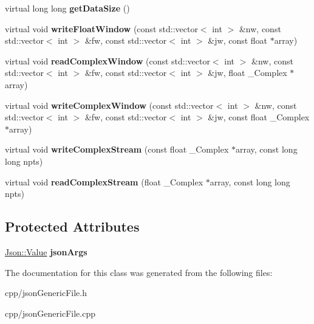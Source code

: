 \begin{DoxyCompactItemize}
\item 
\mbox{\label{class_s_e_p_1_1json_generic_file_aa49a4462c18f241119339ca22d90352d}} 
virtual long long {\bfseries get\+Data\+Size} ()
\item 
\mbox{\label{class_s_e_p_1_1json_generic_file_a056d1d1425a9b0c3be5aa33c79beb242}} 
virtual void {\bfseries write\+Float\+Window} (const std\+::vector$<$ int $>$ \&nw, const std\+::vector$<$ int $>$ \&fw, const std\+::vector$<$ int $>$ \&jw, const float $\ast$array)
\item 
\mbox{\label{class_s_e_p_1_1json_generic_file_addf6e5b29e5abf50c670e3b6bb6748cf}} 
virtual void {\bfseries read\+Complex\+Window} (const std\+::vector$<$ int $>$ \&nw, const std\+::vector$<$ int $>$ \&fw, const std\+::vector$<$ int $>$ \&jw, float \+\_\+\+Complex $\ast$array)
\item 
\mbox{\label{class_s_e_p_1_1json_generic_file_a5de25cde8dde11df0d9a6d149b281a8b}} 
virtual void {\bfseries write\+Complex\+Window} (const std\+::vector$<$ int $>$ \&nw, const std\+::vector$<$ int $>$ \&fw, const std\+::vector$<$ int $>$ \&jw, const float \+\_\+\+Complex $\ast$array)
\item 
\mbox{\label{class_s_e_p_1_1json_generic_file_abc9363a44c4afed3946f6462f87165f7}} 
virtual void {\bfseries write\+Complex\+Stream} (const float \+\_\+\+Complex $\ast$array, const long long npts)
\item 
\mbox{\label{class_s_e_p_1_1json_generic_file_aeeb1d1cf529b8cf937c72a04c66d8cbb}} 
virtual void {\bfseries read\+Complex\+Stream} (float \+\_\+\+Complex $\ast$array, const long long npts)
\end{DoxyCompactItemize}
\subsection*{Protected Attributes}
\begin{DoxyCompactItemize}
\item 
\mbox{\label{class_s_e_p_1_1json_generic_file_a62cd2d0cc74f9d1f2585d3521d107911}} 
\hyperlink{class_json_1_1_value}{Json\+::\+Value} {\bfseries json\+Args}
\end{DoxyCompactItemize}


The documentation for this class was generated from the following files\+:\begin{DoxyCompactItemize}
\item 
cpp/json\+Generic\+File.\+h\item 
cpp/json\+Generic\+File.\+cpp\end{DoxyCompactItemize}
